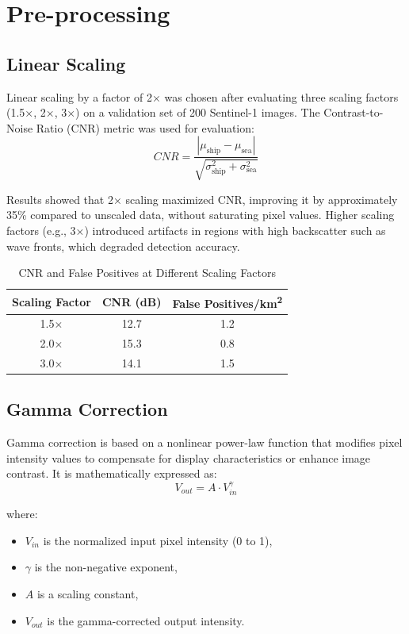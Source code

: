 \documentclass{article}
\begin{document}
	
	
	\newpage
	\printbibliography
	\newpage
	\appendix
	\section{Pre-processing}
	\subsection{Linear Scaling}\label{appendix:linsca}
	Linear scaling by a factor of 2× was chosen after evaluating three scaling factors (1.5×, 2×, 3×) on a validation set of 200 Sentinel-1 images. The Contrast-to-Noise Ratio (CNR) metric was used for evaluation:
	$$CNR = \frac{|\mu_{\text{ship}} - \mu_{\text{sea}}|}{\sqrt{\sigma_{\text{ship}}^2 + \sigma_{\text{sea}}^2}}
	$$
	
	Results showed that 2× scaling maximized CNR, improving it by approximately 35\% compared to unscaled data, without saturating pixel values. Higher scaling factors (e.g., 3×) introduced artifacts in regions with high backscatter such as wave fronts, which degraded detection accuracy.
	
	\begin{table}[h]
		\centering
		\begin{tabular}{ccc}
			\hline
			Scaling Factor & CNR (dB) & False Positives/km\textsuperscript{2} \\
			\hline
			1.5$\times$ & 12.7 & 1.2 \\
			2.0$\times$ & 15.3 & 0.8 \\
			3.0$\times$ & 14.1 & 1.5 \\
			\hline
		\end{tabular}
		\caption{CNR and False Positives at Different Scaling Factors}
		\label{tab:cnr_fpp}
	\end{table}
	
	
	\subsection{Gamma Correction} \label{appendix:gamma}
	Gamma correction is based on a nonlinear power-law function that modifies pixel intensity values to compensate for display characteristics or enhance image contrast. It is mathematically expressed as:
	$$V_{out}=A \cdot V_{in}^\gamma$$
	
	
	where: 
	\begin{itemize}
		\item $V_{in}$ is the normalized input pixel intensity (0 to 1),
		\item $\gamma$ is the non-negative exponent,
		\item $A$ is a scaling constant,
		\item $V_{out}$ is the gamma-corrected output intensity.
	\end{itemize}
	
\end{document}
